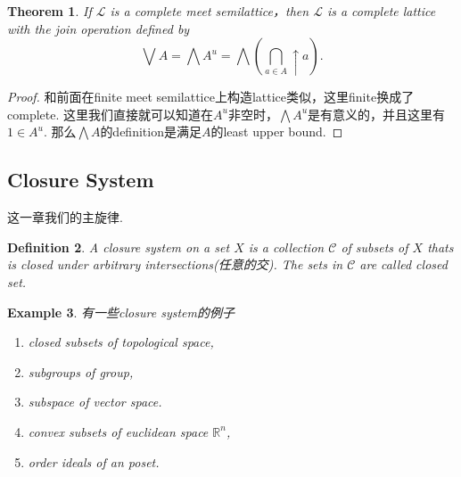\documentclass{article}
\newtheorem{theorem}{Theorem}[section]
\newtheorem{example}[theorem]{Example}
\newtheorem{definition}[theorem]{Definition}
\newcommand\lattice{\mathcal{L}}
\begin{document}

\begin{theorem}
\rm If $\lattice$ is a complete meet semilattice，then $\lattice$ is a complete lattice with the join operation defined by
$$
\bigvee A = \bigwedge A^u = \bigwedge (\bigcap\limits_{a \in A} \uparrow a).
$$
\end{theorem}

\begin{proof}
和前面在finite meet semilattice上构造lattice类似，这里finite换成了complete. 这里我们直接就可以知道在$A^u$非空时，$\bigwedge A^u$是有意义的，并且这里有$1 \in A^u$. 那么$\bigwedge A$的definition是满足$A$的least upper bound.
\end{proof}

\newpage
\subsection{Closure System}

{\color{blue} 这一章我们的主旋律.
\begin{center}
\end{center}
}
\begin{definition}
\rm A {\color{red} closure system} on a set $X$ is a collection $\mathcal{C}$ of subsets of $X$ thats is closed under arbitrary intersections(任意的交). The sets in $\mathcal{C}$ are called closed set. 
\end{definition}

\begin{example}
\rm 有一些closure system的例子
\begin{enumerate}
	\item closed subsets of topological space,
	\item subgroups of group,
	\item subspace of vector space.
	\item convex subsets of euclidean space $\mathbb{R}^n$,
	\item order ideals of an poset.
\end{enumerate}
\end{example}
\end{document}
